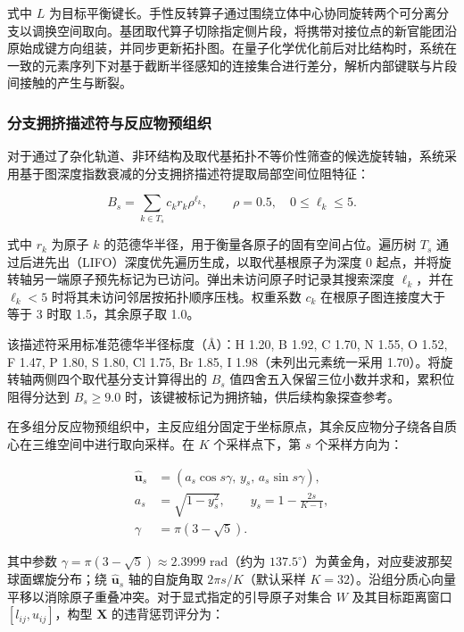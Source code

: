 式中 $L$ 为目标平衡键长。手性反转算子通过围绕立体中心协同旋转两个可分离分支以调换空间取向。基团取代算子切除指定侧片段，将携带对接位点的新官能团沿原始成键方向组装，并同步更新拓扑图。在量子化学优化前后对比结构时，系统在一致的元素序列下对基于截断半径感知的连接集合进行差分，解析内部键联与片段间接触的产生与断裂。

\subsubsection{分支拥挤描述符与反应物预组织}
对于通过了杂化轨道、非环结构及取代基拓扑不等价性筛查的候选旋转轴，系统采用基于图深度指数衰减的分支拥挤描述符提取局部空间位阻特征：

\begin{equation}\label{eq:methods-04}
B_s=\sum_{k\in T_s} c_k r_k \rho^{\ell_k},\qquad\rho=0.5,\quad 0\le \ell_k\le 5.
\end{equation}

式中 $r_k$ 为原子 $k$ 的范德华半径，用于衡量各原子的固有空间占位。遍历树 $T_s$ 通过后进先出（LIFO）深度优先遍历生成，以取代基根原子为深度 0 起点，并将旋转轴另一端原子预先标记为已访问。弹出未访问原子时记录其搜索深度 $\ell_k$，并在 $\ell_k<5$ 时将其未访问邻居按拓扑顺序压栈。权重系数 $c_k$ 在根原子图连接度大于等于 3 时取 1.5，其余原子取 1.0。

该描述符采用标准范德华半径标度（Å）：H 1.20, B 1.92, C 1.70, N 1.55, O 1.52, F 1.47, P 1.80, S 1.80, Cl 1.75, Br 1.85, I 1.98（未列出元素统一采用 1.70）。将旋转轴两侧四个取代基分支计算得出的 $B_s$ 值四舍五入保留三位小数并求和，累积位阻得分达到 $B_s\ge 9.0$ 时，该键被标记为拥挤轴，供后续构象探查参考。

在多组分反应物预组织中，主反应组分固定于坐标原点，其余反应物分子绕各自质心在三维空间中进行取向采样。在 $K$ 个采样点下，第 $s$ 个采样方向为：

\begin{equation}\label{eq:methods-05}
\begin{aligned}
\hat{\mathbf{u}}_s&=(a_s\cos s\gamma,\,y_s,\,a_s\sin s\gamma),\\
a_s&=\sqrt{1-y_s^2},\qquad y_s=1-\frac{2s}{K-1},\\
\gamma&=\pi(3-\sqrt{5}).
\end{aligned}
\end{equation}

其中参数 $\gamma=\pi(3-\sqrt{5})\approx 2.3999\text{ rad}$（约为 $137.5^\circ$）为黄金角，对应斐波那契球面螺旋分布；绕 $\hat{\mathbf{u}}_s$ 轴的自旋角取 $2\pi s/K$（默认采样 $K=32$）。沿组分质心向量平移以消除原子重叠冲突。对于显式指定的引导原子对集合 $W$ 及其目标距离窗口 $[l_{ij},u_{ij}]$，构型 $\mathbf{X}$ 的违背惩罚评分为：

